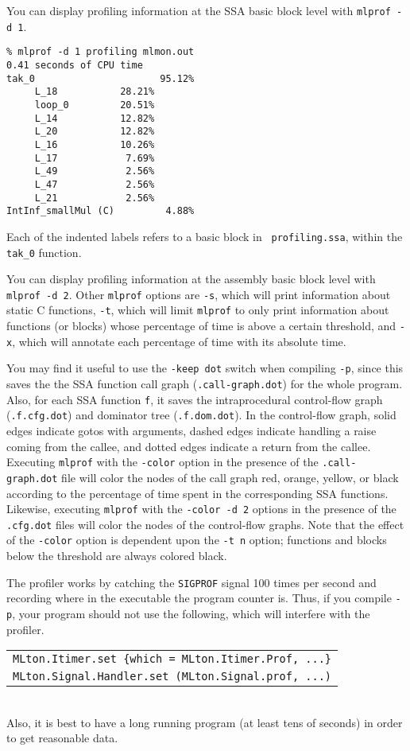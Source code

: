 You can display profiling information at the SSA basic block level with
{\tt mlprof -d 1}.

\begin{verbatim}
% mlprof -d 1 profiling mlmon.out
0.41 seconds of CPU time
tak_0                      95.12%
     L_18           28.21%       
     loop_0         20.51%       
     L_14           12.82%       
     L_20           12.82%       
     L_16           10.26%       
     L_17            7.69%       
     L_49            2.56%       
     L_47            2.56%       
     L_21            2.56%       
IntInf_smallMul (C)         4.88%
\end{verbatim}
Each of the indented labels refers to a basic block in {\tt
  profiling.ssa}, within the {\tt tak\_0} function.

You can display profiling information at the assembly basic block level with
{\tt mlprof -d 2}.  Other {\tt mlprof} options are
{\tt -s}, which will print information about static C functions, {\tt -t},
which will limit {\tt mlprof} to only print information about functions (or
blocks) whose percentage of time is above a certain threshold, and {\tt -x}, 
which will annotate each percentage of time with its absolute time.

You may find it useful to use the {\tt -keep dot} switch when
compiling {\tt -p}, since this saves the the SSA function call graph
({\tt .call-graph.dot}) for the whole program.  Also, for each SSA
function {\tt f}, it saves the intraprocedural control-flow graph
({\tt .f.cfg.dot}) and dominator tree ({\tt .f.dom.dot}).  In the
control-flow graph, solid edges indicate gotos with arguments, dashed
edges indicate handling a raise coming from the callee, and dotted
edges indicate a return from the callee.  Executing {\tt mlprof} with
the {\tt -color} option in the presence of the {\tt .call-graph.dot}
file will color the nodes of the call graph red, orange, yellow, or
black according to the percentage of time spent in the corresponding
SSA functions.  Likewise, executing {\tt mlprof} with the {\tt -color
  -d 2} options in the presence of the {\tt .cfg.dot} files will color
the nodes of the control-flow graphs.  Note that the effect of the
{\tt -color} option is dependent upon the {\tt -t n} option; functions
and blocks below the threshold are always colored black.

The profiler works by catching the {\tt SIGPROF} signal 100 times per second and
recording where in the executable the program counter is.  Thus, if you compile
{\tt -p}, your program should not use the following, which will interfere with
the profiler.\\
\begin{tabular}{l}
\tt MLton.Itimer.set \{which = MLton.Itimer.Prof, ...\}\\
\tt MLton.Signal.Handler.set (MLton.Signal.prof, ...)
\end{tabular}\\
Also, it is best to have a long running program (at least tens of seconds) in
order to get reasonable data. 

